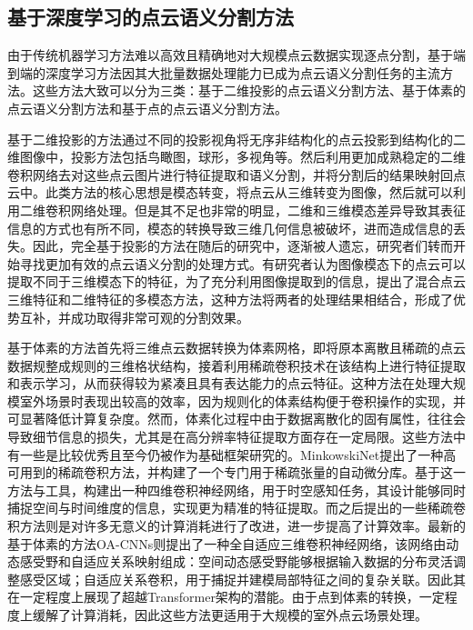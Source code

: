 \subsection{基于深度学习的点云语义分割方法}
由于传统机器学习方法难以高效且精确地对大规模点云数据实现逐点分割，基于端到端的深度学习方法因其大批量数据处理能力已成为点云语义分割任务的主流方法。这些方法大致可以分为三类：基于二维投影的点云语义分割方法、基于体素的点云语义分割方法和基于点的点云语义分割方法。

基于二维投影的方法通过不同的投影视角将无序非结构化的点云投影到结构化的二维图像中，投影方法包括鸟瞰图，球形，多视角等。然后利用更加成熟稳定的二维卷积网络去对这些点云图片进行特征提取和语义分割，并将分割后的结果映射回点云中。此类方法的核心思想是模态转变，将点云从三维转变为图像，然后就可以利用二维卷积网络处理。但是其不足也非常的明显，二维和三维模态差异导致其表征信息的方式也有所不同，模态的转换导致三维几何信息被破坏，进而造成信息的丢失。因此，完全基于投影的方法在随后的研究中，逐渐被人遗忘，研究者们转而开始寻找更加有效的点云语义分割的处理方式。有研究者认为图像模态下的点云可以提取不同于三维模态下的特征，为了充分利用图像提取到的信息，提出了混合点云三维特征和二维特征的多模态方法，这种方法将两者的处理结果相结合，形成了优势互补，并成功取得非常可观的分割效果。

基于体素的方法首先将三维点云数据转换为体素网格，即将原本离散且稀疏的点云数据规整成规则的三维格状结构，接着利用稀疏卷积技术在该结构上进行特征提取和表示学习，从而获得较为紧凑且具有表达能力的点云特征。这种方法在处理大规模室外场景时表现出较高的效率，因为规则化的体素结构便于卷积操作的实现，并可显著降低计算复杂度。然而，体素化过程中由于数据离散化的固有属性，往往会导致细节信息的损失，尤其是在高分辨率特征提取方面存在一定局限。这些方法中有一些是比较优秀且至今仍被作为基础框架研究的。MinkowskiNet提出了一种高可用到的稀疏卷积方法，并构建了一个专门用于稀疏张量的自动微分库。基于这一方法与工具，构建出一种四维卷积神经网络，用于时空感知任务，其设计能够同时捕捉空间与时间维度的信息，实现更为精准的特征提取。而之后提出的一些稀疏卷积方法则是对许多无意义的计算消耗进行了改进，进一步提高了计算效率。最新的基于体素的方法OA-CNNs则提出了一种全自适应三维卷积神经网络，该网络由动态感受野和自适应关系映射组成：空间动态感受野能够根据输入数据的分布灵活调整感受区域；自适应关系卷积，用于捕捉并建模局部特征之间的复杂关联。因此其在一定程度上展现了超越Transformer架构的潜能。由于点到体素的转换，一定程度上缓解了计算消耗，因此这些方法更适用于大规模的室外点云场景处理。


